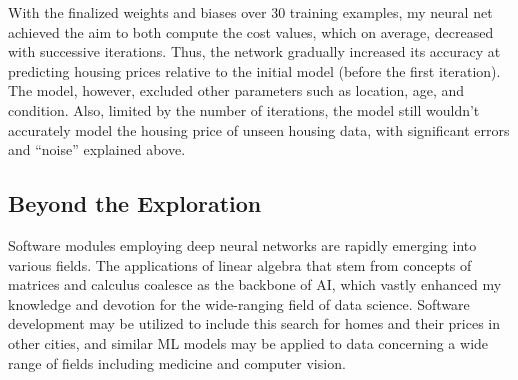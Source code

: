 \documentclass[12pt,a4paper]{article}
\begin{document}
With the finalized weights and biases over 30 training examples, my neural net achieved the aim to both compute the cost values, which on average, decreased with successive iterations. Thus, the network gradually increased its accuracy at predicting housing prices relative to the initial model (before the first iteration). The model, however, excluded other parameters such as location, age, and condition. Also, limited by the number of iterations, the model still wouldn’t accurately model the housing price of unseen housing data, with significant errors and “noise” explained above.

\subsection{Beyond the Exploration}
Software modules employing deep neural networks are rapidly emerging into various fields. The applications of linear algebra that stem from concepts of matrices and calculus coalesce as the backbone of AI, which vastly enhanced my knowledge and devotion for the wide-ranging field of data science. Software development may be utilized to include this search for homes and their prices in other cities, and similar ML models may be applied to data concerning a wide range of fields including medicine and computer vision.



























\newpage
\end{document}
